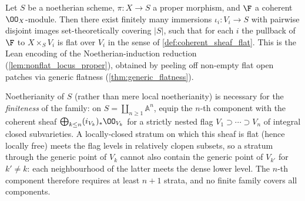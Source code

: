 \begin{lemma}

  \label{lem:flat_locus_reduction_lean}
  Let \(S\) be a noetherian scheme, \(\pi : X \to S\) a proper morphism,
  and \(\F\) a coherent \(\OO_X\)-module. Then there exist finitely many
  immersions \(\iota_i : V_i \to S\) with pairwise disjoint images
  set-theoretically covering \(|S|\), such that for each \(i\) the pullback of
  \(\F\) to \(X \times_S V_i\) is flat over \(V_i\) in the sense of
  \cref{def:coherent_sheaf_flat}.  This is the Lean encoding of the
  Noetherian-induction reduction (\cref{lem:nonflat_locus_proper}), obtained by
  peeling off non-empty flat open patches via generic flatness
  (\cref{thm:generic_flatness}).

  Noetherianity of \(S\) (rather than mere local noetherianity) is necessary
  for the \emph{finiteness} of the family: on
  \(S = \coprod_{n \ge 1} \mathbb{A}^n\), equip the \(n\)-th component with
  the coherent sheaf \(\bigoplus_{k \le n} (i_{V_k})_* \OO_{V_k}\) for a
  strictly nested flag \(V_1 \supset \cdots \supset V_n\) of integral closed
  subvarieties.  A locally-closed stratum on which this sheaf is flat (hence
  locally free) meets the flag levels in relatively clopen subsets, so a
  stratum through the generic point of \(V_k\) cannot also contain the
  generic point of \(V_{k'}\) for \(k' \neq k\): each neighbourhood of the
  latter meets the dense lower level.  The \(n\)-th component therefore
  requires at least \(n + 1\) strata, and no finite family covers all
  components.
\end{lemma}

